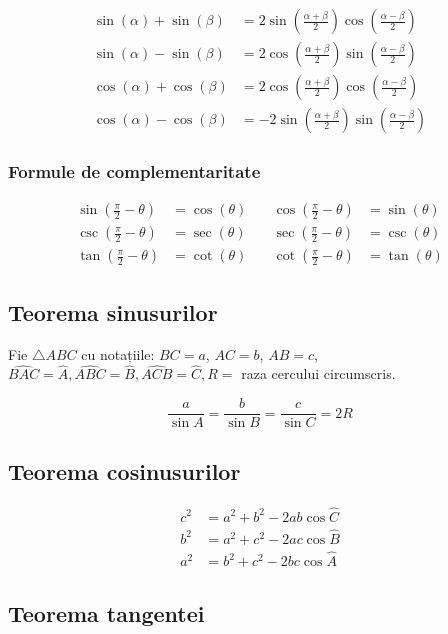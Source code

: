 \documentclass[11pt,a4paper]{article}
\begin{document}
\begin{align*}
\sin(\alpha) + \sin(\beta) &= 2 \sin\left( \frac{\alpha + \beta}{2} \right) \cos\left( \frac{\alpha - \beta}{2} \right) \\
\sin(\alpha) - \sin(\beta) &= 2 \cos\left( \frac{\alpha + \beta}{2} \right) \sin\left( \frac{\alpha - \beta}{2} \right) \\
\cos(\alpha) + \cos(\beta) &= 2 \cos\left( \frac{\alpha + \beta}{2} \right) \cos\left( \frac{\alpha - \beta}{2} \right) \\
\cos(\alpha) - \cos(\beta) &= -2 \sin\left( \frac{\alpha + \beta}{2} \right) \sin\left( \frac{\alpha - \beta}{2} \right)
\end{align*}
\subsubsection{Formule de complementaritate}

\begin{align*}
\sin\left( \frac{\pi}{2} - \theta \right) &= \cos(\theta) &\quad
\cos\left( \frac{\pi}{2} - \theta \right) &= \sin(\theta) \\
\csc\left( \frac{\pi}{2} - \theta \right) &= \sec(\theta) &\quad
\sec\left( \frac{\pi}{2} - \theta \right) &= \csc(\theta) \\
\tan\left( \frac{\pi}{2} - \theta \right) &= \cot(\theta) &\quad
\cot\left( \frac{\pi}{2} - \theta \right) &= \tan(\theta)
\end{align*}
\subsection{Teorema sinusurilor}
Fie $\triangle{ABC}$ cu notațiile: $BC=a$, $AC=b$, $AB=c$, $\widehat{BAC}=\widehat{A}, \widehat{ABC}=\widehat{B}, \widehat{ACB}=\widehat{C}, R= $ raza cercului circumscris.

$$\frac{a}{\sin A} = \frac{b}{\sin B} = \frac{c}{\sin C} = 2R$$
\subsection{Teorema cosinusurilor}

\begin{align*}
c^2 &= a^2 + b^2 - 2ab\cos\widehat{C} \\
b^2 &= a^2 + c^2 - 2ac\cos\widehat{B} \\
a^2 &= b^2 + c^2 - 2bc\cos\widehat{A}
\end{align*}
\subsection{Teorema tangentei}
\end{document}
